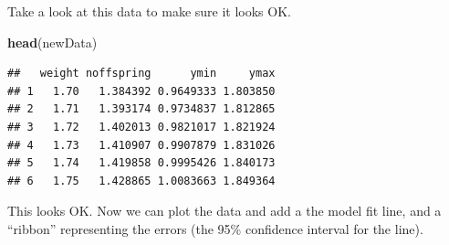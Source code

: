\documentclass[
  a4paperpaper,
]{book}
\newenvironment{Shaded}{\begin{snugshade}}{\end{snugshade}}
\newcommand{\CommentTok}[1]{\textcolor[rgb]{0.56,0.35,0.01}{\textit{#1}}}
\newcommand{\DataTypeTok}[1]{\textcolor[rgb]{0.13,0.29,0.53}{#1}}
\newcommand{\FloatTok}[1]{\textcolor[rgb]{0.00,0.00,0.81}{#1}}
\newcommand{\KeywordTok}[1]{\textcolor[rgb]{0.13,0.29,0.53}{\textbf{#1}}}
\newcommand{\NormalTok}[1]{#1}
\newcommand{\OperatorTok}[1]{\textcolor[rgb]{0.81,0.36,0.00}{\textbf{#1}}}
\newcommand{\OtherTok}[1]{\textcolor[rgb]{0.56,0.35,0.01}{#1}}
\newcommand{\StringTok}[1]{\textcolor[rgb]{0.31,0.60,0.02}{#1}}
\begin{document}
\begin{Shaded}
\end{Shaded}

Take a look at this data to make sure it looks OK.

\begin{Shaded}
\begin{Highlighting}[]
\KeywordTok{head}\NormalTok{(newData)}
\end{Highlighting}
\end{Shaded}

\begin{verbatim}
##   weight noffspring      ymin     ymax
## 1   1.70   1.384392 0.9649333 1.803850
## 2   1.71   1.393174 0.9734837 1.812865
## 3   1.72   1.402013 0.9821017 1.821924
## 4   1.73   1.410907 0.9907879 1.831026
## 5   1.74   1.419858 0.9995426 1.840173
## 6   1.75   1.428865 1.0083663 1.849364
\end{verbatim}

This looks OK. Now we can plot the data and add a the model fit line, and a ``ribbon'' representing the errors (the 95\% confidence interval for the line).
\end{document}
